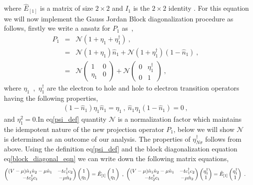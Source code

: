 \documentclass[12pt,a4paper]{article}
\begin{document}
where $\hat{E}_{[1]}$ is a matrix of size $2\times 2$ and $I_{1}$ is the $2\times 2$ identity . For this equation we will now implement the Gauss Jordan Block diagonalization procedure as follows, firstly we write a ansatz for $P_{1}$ as~, 
\begin{eqnarray}
P_{1} &=& \mathcal{N}(1+\eta_{1}+\eta^{\dagger}_{1})~,\nonumber\\
&=&\mathcal{N}(1+\eta_{1})\hat{n}_{1}+\mathcal{N}(1+\eta^{\dagger}_{1})(1-\hat{n}_{1})~,~\nonumber\\
&=&\mathcal{N}\begin{pmatrix}
1 & 0\\
\eta_{1} & 0
\end{pmatrix}+\mathcal{N}\begin{pmatrix}
0 & \eta^{\dagger}_{1}\\
0 & 1
\end{pmatrix}~,\label{psi_def}
\end{eqnarray}
where $\eta_{1}$~,~$\eta^{\dagger}_{1}$ are the electron to hole and hole to electron transition operators having the following properties,
\begin{eqnarray}
(1-\hat{n}_{1})\eta_{1}\hat{n}_{1}=\eta_{1}~,~\hat{n}_{1}\eta_{1}(1-\hat{n}_{1})=0~,~\nonumber
\end{eqnarray}
and $\eta^{2}_{1}=0$.In eq\eqref{psi_def} quantity $\mathcal{N}$ is a normalization factor which maintains the idempotent nature of the new projection operator $P_{1}$, below we will show $\mathcal{N}$ is determined as an outcome of our analysis.
The properties of $\eta^{\dagger}_{N\sigma}$ follows from above.
Using the definition eq\eqref{psi_def} and the block diagonalization equation eq\eqref{block_diagonal_eqn} we can write down the following matrix equations,
\begin{eqnarray}
\begin{pmatrix}
			(V-\mu)\hat{n}_{1}\hat{n}_{2}-\mu\hat{n}_{1}							 & -tc^{\dagger}_{1}c_{2}\\
				-tc^{\dagger}_{2}c_{1}						& -\mu\hat{n}_{2}
											\end{pmatrix}\begin{pmatrix}
1 \\ \eta_{1}
\end{pmatrix} = \hat{E}_{[1]} \begin{pmatrix}
1 \\ \eta_{1}
\end{pmatrix}~,~\begin{pmatrix}
			(V-\mu)\hat{n}_{1}\hat{n}_{2}-\mu\hat{n}_{1}							 & -tc^{\dagger}_{1}c_{2}\\
				-tc^{\dagger}_{2}c_{1}						& -\mu\hat{n}_{2}
											\end{pmatrix}\begin{pmatrix}
\eta^{\dagger}_{1} \\ 1
\end{pmatrix} = \hat{E}_{[1]} \begin{pmatrix}
\eta^{\dagger}_{1} \\ 1
\end{pmatrix}~.\hspace*{0.2cm}\label{matrix_eqn1}
\end{eqnarray}
\end{document}
